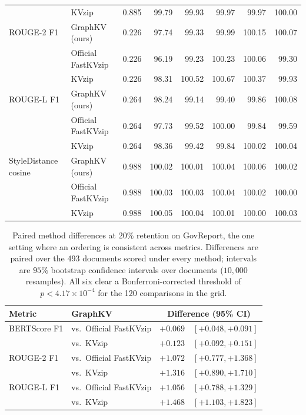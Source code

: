 \begin{table}[t]
\begin{tabular}{@{}llrrrrrr@{}}
 & KVzip & 0.885 & 99.79 & 99.93 & 99.97 & 99.97 & 100.00 \\
\noalign{\smallskip}
ROUGE-2 F1 & GraphKV (ours) & 0.226 & 97.74 & 99.33 & 99.99 & 100.15 & 100.07 \\
 & Official FastKVzip & 0.226 & 96.19 & 99.23 & 100.23 & 100.06 & 99.30 \\
 & KVzip & 0.226 & 98.31 & 100.52 & 100.67 & 100.37 & 99.93 \\
\noalign{\smallskip}
ROUGE-L F1 & GraphKV (ours) & 0.264 & 98.24 & 99.14 & 99.40 & 99.86 & 100.08 \\
 & Official FastKVzip & 0.264 & 97.73 & 99.52 & 100.00 & 99.84 & 99.59 \\
 & KVzip & 0.264 & 98.36 & 99.42 & 99.84 & 100.02 & 100.04 \\
\noalign{\smallskip}
StyleDistance cosine & GraphKV (ours) & 0.988 & 100.02 & 100.01 & 100.04 & 100.06 & 100.02 \\
 & Official FastKVzip & 0.988 & 100.03 & 100.03 & 100.04 & 100.02 & 100.00 \\
 & KVzip & 0.988 & 100.05 & 100.04 & 100.01 & 100.00 & 100.03 \\
\hline
\end{tabular}
\end{table}

\begin{table}[t]
\caption{Paired method differences at $20\%$ retention on GovReport, the one setting where an ordering is consistent across metrics. Differences are paired over the 493 documents scored under every method; intervals are $95\%$ bootstrap confidence intervals over documents ($10{,}000$ resamples). All six clear a Bonferroni-corrected threshold of $p < 4.17\times10^{-4}$ for the 120 comparisons in the grid.}
\label{tab:summarization-significance}
\centering
\small
\begin{tabular}{@{}llr@{\,}l@{}}
\hline
Metric & GraphKV & \multicolumn{2}{c}{Difference (95\% CI)} \\
\hline
BERTScore F1 & vs.\ Official FastKVzip & $+0.069$ & $[+0.048, +0.091]$ \\
 & vs.\ KVzip & $+0.123$ & $[+0.092, +0.151]$ \\
ROUGE-2 F1 & vs.\ Official FastKVzip & $+1.072$ & $[+0.777, +1.368]$ \\
 & vs.\ KVzip & $+1.316$ & $[+0.890, +1.710]$ \\
ROUGE-L F1 & vs.\ Official FastKVzip & $+1.056$ & $[+0.788, +1.329]$ \\
 & vs.\ KVzip & $+1.468$ & $[+1.103, +1.823]$ \\
\hline
\end{tabular}
\end{table}
